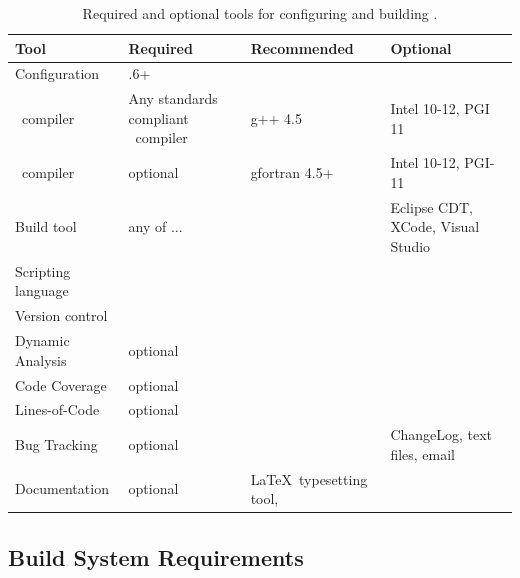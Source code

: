 \begin{table}
  \begin{center}
    \caption{Required and optional tools for configuring and building \draco.}
    \label{tab:reqtools}
    \begin{tabular}{lp{1.5in}p{1.5in}p{1.5in}}\hline\hline
    
          Tool & Required  & Recommended & Optional \\ \hline
	Configuration & \cmake-2.8.6+ & \ctest & \cdash  \\
	\cpp\ compiler & Any standards compliant \cpp\ compiler &  g++ 4.5 & Intel 10-12, PGI 11 \\
	\fortran\ compiler & optional & gfortran 4.5+ & Intel 10-12, PGI-11 \\
	Build tool & any of ... & \gmake & Eclipse CDT, XCode, Visual Studio \\
	Scripting language & \cmake & \python & \perl \\
	Version control & \svn & & \git \\
	Dynamic Analysis & optional & \valgrind & \\
	Code Coverage & optional& \bullseye & \\
	Lines-of-Code & optional & \cloc & \\
	Bug Tracking & optional & \teamforge & ChangeLog, text files, email \\
	Documentation & optional & \LaTeX\ typesetting tool, \doxygen & \\	
	\hline \hline

    \end{tabular}
  \end{center}
\end{table}



\subsection{Build System Requirements}
\label{sec:build_sys_req}

